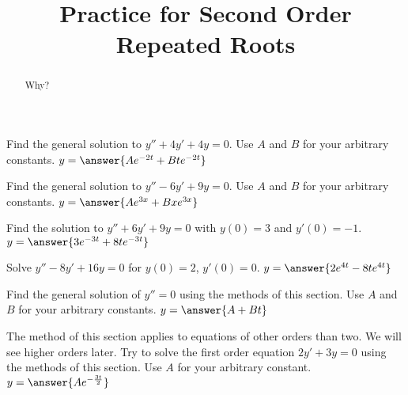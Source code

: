 \documentclass{ximera}
\title{Practice for Second Order Repeated Roots}
\begin{document}
\begin{abstract}
    Why?
\end{abstract}
\maketitle



\begin{exercise}
    Find the general solution to $y'' + 4y' + 4y = 0$. Use $A$ and $B$ for your arbitrary constants. $y = \answer{Ae^{-2t} + Bte^{-2t}}$
\end{exercise}

\begin{exercise}%
    Find the general solution to $y''-6y'+9y=0$. Use $A$ and $B$ for your arbitrary constants. $y = \answer{Ae^{3x} + Bx e^{3x}}$
\end{exercise}


\begin{exercise}
    Find the solution to $y'' + 6y' + 9y = 0$ with $y(0) = 3$ and $y'(0) = -1$. $y = \answer{3e^{-3t} + 8te^{-3t}}$
\end{exercise}

\begin{exercise}
    Solve $y'' - 8y' + 16 y = 0$ for $y(0) = 2$, $y'(0) = 0$. $y = \answer{2e^{4t} - 8te^{4t}}$
\end{exercise}

\begin{exercise}
    Find the general solution of $y'' = 0$ using the methods of this section. Use $A$ and $B$ for your arbitrary constants. $y = \answer{A + Bt}$
\end{exercise}

\begin{exercise}
    The method of this section applies to equations of other orders than two. We will see higher orders later.  Try to solve the first order equation $2y' + 3y = 0$ using the methods of this section. Use $A$ for your arbitrary constant. $y = \answer{Ae^{-\frac{3t}{2}}}$
\end{exercise}
\end{document}
